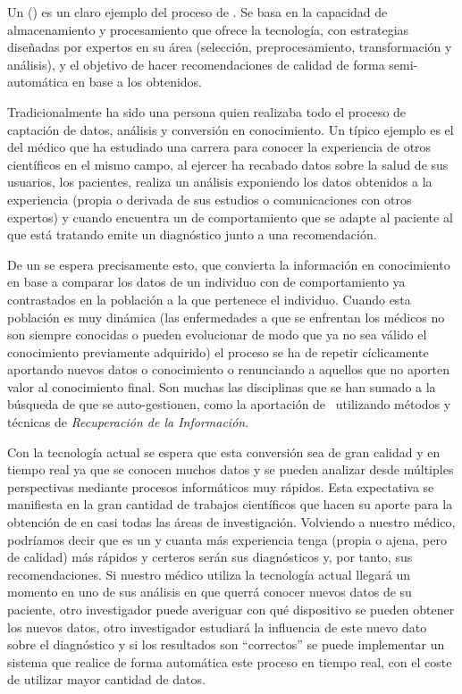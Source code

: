 Un \sr (\SR) es un claro ejemplo del proceso de \KDD. Se basa en la capacidad de almacenamiento y procesamiento que ofrece la tecnología, con estrategias diseñadas por expertos en su área (selección, preprocesamiento, transformación y análisis), y el objetivo de hacer recomendaciones de calidad de forma semi-automática en base a los \patrones obtenidos.

Tradicionalmente ha sido una persona quien realizaba todo el proceso de captación de datos, análisis y conversión en conocimiento. Un típico ejemplo es el del médico que ha estudiado una carrera para conocer la experiencia de otros científicos en el mismo campo, al ejercer ha recabado datos sobre la salud de sus usuarios, los pacientes, realiza un análisis exponiendo los datos obtenidos a la experiencia (propia o derivada de sus estudios o comunicaciones con otros expertos) y cuando encuentra un \patron de comportamiento que se adapte al paciente al que está tratando emite un diagnóstico junto a una recomendación.

De un \sr se espera precisamente esto, que convierta la información en conocimiento en base a comparar los datos de un individuo con \patrones de comportamiento ya contrastados en la población a la que pertenece el individuo. Cuando esta población es muy dinámica (las enfermedades a que se enfrentan los médicos no son siempre conocidas o pueden evolucionar de modo que ya no sea válido el conocimiento previamente adquirido) el proceso se ha de repetir cíclicamente aportando nuevos datos o conocimiento o renunciando a aquellos que no aporten valor al conocimiento final. Son muchas las disciplinas que se han sumado a la búsqueda de \srs que se auto-gestionen, como la aportación de~\citet{KourisMakrisTsakalidis-UsingIR-2005} utilizando métodos y técnicas de \emph{Recuperación de la Información}.

Con la tecnología actual se espera que esta conversión sea de gran calidad y en tiempo real ya que se conocen muchos datos y se pueden analizar desde múltiples perspectivas mediante procesos informáticos muy rápidos. Esta expectativa se manifiesta en la gran cantidad de trabajos científicos que hacen su aporte para la obtención de \srs en casi todas las áreas de investigación. Volviendo a nuestro médico, podríamos decir que es un \SR y cuanta más experiencia tenga (propia o ajena, pero de calidad) más rápidos y certeros serán sus diagnósticos y, por tanto, sus recomendaciones. Si nuestro médico utiliza la tecnología actual llegará un momento en uno de sus análisis en que querrá conocer nuevos datos de su paciente, otro investigador puede averiguar con qué dispositivo se pueden obtener los nuevos datos, otro investigador estudiará la influencia de este nuevo dato sobre el diagnóstico y si los resultados son "`correctos"' se puede implementar un sistema que realice de forma automática este proceso en tiempo real, con el coste de utilizar mayor cantidad de datos.

